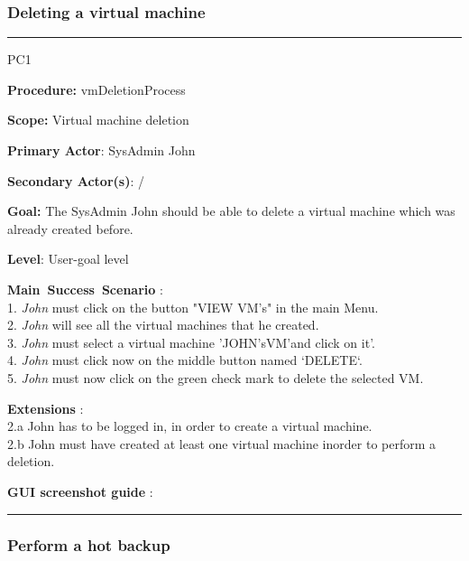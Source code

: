 \subsubsection{Deleting a virtual machine}

\hrule
\vspace{0.5cm}
\begin{lyxlist}{PC1}
\small{
\item [\textbf{Procedure:}] vmDeletionProcess
\item [\textbf{Scope:}] Virtual machine deletion
\item [\textbf{Primary Actor}:] SysAdmin John 
\item [\textbf{Secondary Actor(s)}:] /
\item [\textbf{Goal:}] The SysAdmin John should be able to delete a virtual
machine which was already created before.
\item [\textbf{Level}:] User-goal level
\item [\textbf{Main~Success~Scenario}]:\\
1. \emph{John} must click on the button "VIEW VM's" in the main Menu.\\
2. \emph{John} will see all the virtual machines that he created.\\
3. \emph{John} must select a virtual machine 'JOHN'sVM'and click on it'.\\
4. \emph{John} must click now on the middle button named `DELETE`.\\
5. \emph{John} must now click on the green check mark to delete the selected
VM.\\



\item [\textbf{Extensions}]:\\
2.a John has to be logged in, in order to create a virtual machine.\\
2.b John must have created at least one virtual machine inorder to perform a
deletion.\\

\item [\textbf{GUI screenshot guide}]:\\
}
\end{lyxlist}
\hrule
\vspace{0.5cm}







\subsubsection{Perform a hot backup}

